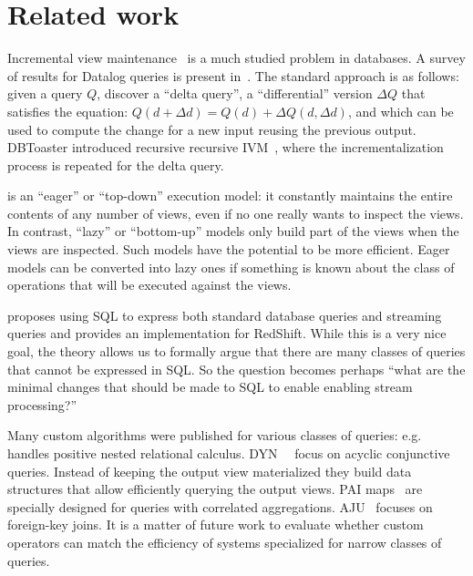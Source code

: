 \section{Related work}\label{sec:related}

Incremental view
maintenance~\cite{gupta-sigmod93,griffin-sigmod95,chaudhuri-icde95,gupta-idb95,chirkova-book12}
is a much studied problem in databases.  A survey of results for
Datalog queries is present in~\cite{motik-ai19}.  The standard
approach is as follows: given a query $Q$, discover a ``delta query'',
a ``differential'' version $\Delta Q$ that satisfies the equation:
$Q(d+\Delta d)=Q(d)+\Delta Q(d,\Delta d)$, and which can be used to
compute the change for a new input reusing the previous output.
DBToaster introduced recursive recursive
IVM~\cite{ahmad-vldb09,koch-pods10}, where the incrementalization
process is repeated for the delta query.

\dbsp is an ``eager'' or ``top-down'' execution model: it constantly
maintains the entire contents of any number of views, even if no one
really wants to inspect the views.  In contrast, ``lazy'' or
``bottom-up'' models only build part of the views when the views are
inspected.  Such models have the potential to be more efficient.
Eager models can be converted into lazy ones if something is known
about the class of operations that will be executed against the views.

\cite{bengoli-sigmod19} proposes using SQL to express both standard
database queries and streaming queries and provides an implementation
for RedShift.  While this is a very nice goal, the \dbsp theory allows
us to formally argue that there are many classes of queries that
cannot be expressed in SQL.  So the question becomes perhaps ``what
are the minimal changes that should be made to SQL to enable enabling
stream processing?''

Many custom algorithms were published for various classes of queries:
e.g.~\cite{koch-pods16} handles positive nested relational calculus.
DYN~\cite{idris-sigmod17,idris-vldb18}~\cite{idris-sigmod19} focus on acyclic
conjunctive queries.  Instead of keeping the output view materialized
they build data structures that allow efficiently querying the output
views.  PAI maps~\cite{abeysinghe-sigmod22} are specially designed for
queries with correlated aggregations.  AJU~\cite{wang-sigmod20}
focuses on foreign-key joins.  It is a matter of future work to
evaluate whether custom \dbsp operators can match the efficiency of
systems specialized for narrow classes of queries.

